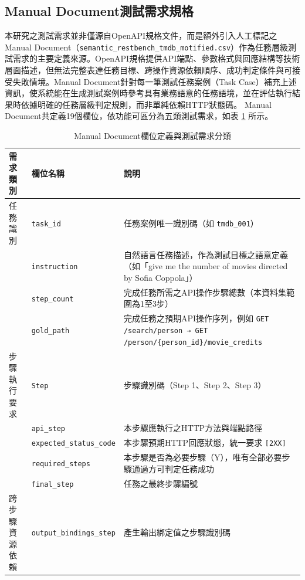 \begin{ZhChapter}
\section{Manual Document測試需求規格}
\text 本研究之測試需求並非僅源自OpenAPI規格文件，而是額外引入人工標記之Manual Document（\texttt{semantic\_restbench\_tmdb\_motified.csv}）作為任務層級測試需求的主要定義來源。OpenAPI規格提供API端點、參數格式與回應結構等技術層面描述，但無法完整表達任務目標、跨操作資源依賴順序、成功判定條件與可接受失敗情境。Manual Document針對每一筆測試任務案例（Task Case）補充上述資訊，使系統能在生成測試案例時參考具有業務語意的任務語境，並在評估執行結果時依據明確的任務層級判定規則，而非單純依賴HTTP狀態碼。
\text Manual Document共定義19個欄位，依功能可區分為五類測試需求，如表 \ref{tab:manual_doc_fields} 所示。

\begin{table}[H]
\centering
\caption{Manual Document欄位定義與測試需求分類}
\label{tab:manual_doc_fields}
\scriptsize
\renewcommand{\arraystretch}{1.1}
\begin{tabularx}{\textwidth}{>{\raggedright\arraybackslash}p{2.2cm} >{\raggedright\arraybackslash}p{4.4cm} >{\raggedright\arraybackslash}X}
\toprule
\textbf{需求類別} & \textbf{欄位名稱} & \textbf{說明} \\
\midrule
任務識別 & \texttt{task\_id} & 任務案例唯一識別碼（如 \texttt{tmdb\_001}） \\
& \texttt{instruction} & 自然語言任務描述，作為測試目標之語意定義（如「give me the number of movies directed by Sofia Coppola」） \\
& \texttt{step\_count} & 完成任務所需之API操作步驟總數（本資料集範圍為1至3步） \\
& \texttt{gold\_path} & 完成任務之預期API操作序列，例如 \texttt{GET /search/person → GET /person/\{person\_id\}/movie\_credits} \\
\midrule
步驟執行要求 & \texttt{Step} & 步驟識別碼（Step 1、Step 2、Step 3） \\
& \texttt{api\_step} & 本步驟應執行之HTTP方法與端點路徑 \\
& \texttt{expected\_status\_code} & 本步驟預期HTTP回應狀態，統一要求 \texttt{[2XX]} \\
& \texttt{required\_steps} & 本步驟是否為必要步驟（Y），唯有全部必要步驟通過方可判定任務成功 \\
& \texttt{final\_step} & 任務之最終步驟編號 \\
\midrule
跨步驟資源依賴 & \texttt{output\_bindings\_step} & 產生輸出綁定值之步驟識別碼 \\

\end{tabularx}
\end{table}
\end{ZhChapter}
